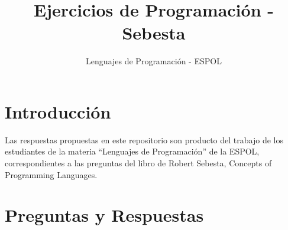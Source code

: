 \documentclass[12pt,oneside]{article}
\title{Ejercicios de Programación - Sebesta}
\author{Lenguajes de Programación - ESPOL}
\begin{document}
\maketitle

	\section{Introducción}
	Las respuestas propuestas en este repositorio son producto del trabajo de los estudiantes de la materia ``Lenguajes de Programación'' de la ESPOL, correspondientes a las preguntas del libro de Robert Sebesta, Concepts of Programming Languages.

	\section{Preguntas y Respuestas}
\end{document}
